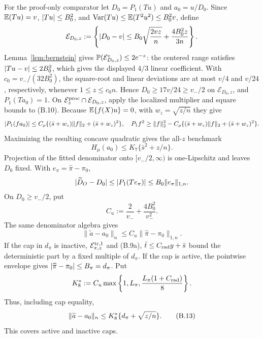 For the proof-only comparator let \(D_0=P_1(Tu)\) and \(a_0=u/D_0\).
Since \(\mathbb E(Tu)=v\), \(\lvert Tu\rvert\le B_0^2\), and
\(\operatorname{Var}(Tu)\le \mathbb E(T^2u^2)\le B_0^2v\), define
\[
 \mathcal E_{D_0,z}:=
 \left\{\lvert D_0-v\rvert\le
 B_0\sqrt{\frac{2vz}{n}}+\frac{4B_0^2z}{3n}\right\}.
\]
Lemma~\ref{lem:bernstein} gives
\(\mathbb P(\mathcal E_{D_0,z}^c)\le2e^{-z}\): the centered range satisfies
\(\lvert Tu-v\rvert\le2B_0^2\), which gives the displayed \(4/3\) linear
coefficient.  With
\(c_0=v_-/(32B_0^2)\), the square-root and linear deviations are at most
\(v/4\) and \(v/24\), respectively, whenever
\(1\le z\le c_0n\).  Hence \(D_0\ge17v/24\ge v_-/2\) on
\(\mathcal E_{D_0,z}\), and \(P_1(Ta_0)=1\).  On
\(\mathcal E_z^{\rm proc}\cap\mathcal E_{D_0,z}\), apply the localized
multiplier and square bounds to (B.10).  Because
\(\mathbb E\{f(X)u\}=0\), with \(w_z=\sqrt{z/n}\) they give
\[
 \lvert P_1(fa_0)\rvert\le C_\rho\{(\bar s+w_z)\lVert f\rVert_2
                  +(\bar s+w_z)^2\},
 \quad
 P_1f^2\ge\lVert f\rVert_2^2-C_\rho\{(\bar s+w_z)\lVert f\rVert_2
                  +(\bar s+w_z)^2\}.
\]
Maximizing the resulting concave quadratic gives the all-\(z\) benchmark
\begin{equation}
 H_\mu(a_0)\le K_7\{\bar s^2+z/n\}.
 \tag{B.12}
\end{equation}
Projection of the fitted denominator onto \([v_-/2,\infty)\) is
one-Lipschitz and leaves \(D_0\) fixed.  With
\(e_\pi=\widehat\pi-\pi_0\),
\[
 \lvert \widetilde D_O-D_0\rvert\le\lvert P_1(Te_\pi)\rvert
 \le B_0\lVert e_\pi\rVert_{1,n}.
\]
On \(D_0\ge v_-/2\), put
\[
 C_u:=\frac2{v_-}+\frac{4B_0^2}{v_-^2}.
\]
The same denominator algebra gives
\[
 \|\widetilde a-a_0\|_n
 \le C_u\|\widehat\pi-\pi_0\|_{1,n}.
\]
If the cap in \(d_\pi\) is inactive,
 \(\mathcal E_{\pi,z}^{\rm tr,1}\) and (B.9a),
\(\bar t\le C_{\rm rad}y+\bar s\) bound the deterministic part by a fixed
multiple of \(d_\pi\).  If the cap is active, the pointwise envelope gives
\(\lvert \widehat\pi-\pi_0\rvert\le B_\pi=d_\pi\).  Put
\[
 K_8^*:=C_u\max\left\{1,L_\pi,
              \frac{L_\pi(1+C_{\rm rad})}{8}\right\}.
\]
Thus, including cap equality,
\begin{equation}
 \lVert \widetilde a-a_0\rVert_n
 \le K_8^*\{d_\pi+\sqrt{z/n}\}.
 \tag{B.13}
\end{equation}
This covers active and inactive caps.

